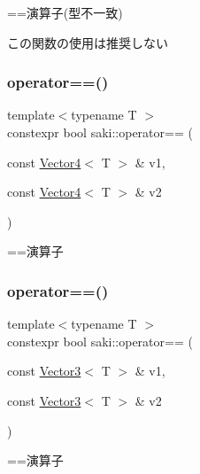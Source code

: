 ==演算子(型不一致) 

この関数の使用は推奨しない \mbox{\label{namespacesaki_ab4626967b917017c2acf6ad76789db6c}} 
\subsubsection{\texorpdfstring{operator==()}{operator==()}\hspace{0.1cm}{\footnotesize\ttfamily [3/10]}}
{\footnotesize\ttfamily template$<$typename T $>$ \\
constexpr bool saki\+::operator== (\begin{DoxyParamCaption}\item[{const \mbox{\hyperlink{classsaki_1_1_vector4}{Vector4}}$<$ T $>$ \&}]{v1,  }\item[{const \mbox{\hyperlink{classsaki_1_1_vector4}{Vector4}}$<$ T $>$ \&}]{v2 }\end{DoxyParamCaption})}



==演算子 

\mbox{\label{namespacesaki_a29747cf04c5a821834f7a1fea39e4050}} 
\subsubsection{\texorpdfstring{operator==()}{operator==()}\hspace{0.1cm}{\footnotesize\ttfamily [4/10]}}
{\footnotesize\ttfamily template$<$typename T $>$ \\
constexpr bool saki\+::operator== (\begin{DoxyParamCaption}\item[{const \mbox{\hyperlink{classsaki_1_1_vector3}{Vector3}}$<$ T $>$ \&}]{v1,  }\item[{const \mbox{\hyperlink{classsaki_1_1_vector3}{Vector3}}$<$ T $>$ \&}]{v2 }\end{DoxyParamCaption})}



==演算子 

\mbox{\label{namespacesaki_aebe3f4c69f62ec8edc68723c5194c3b9}} 

